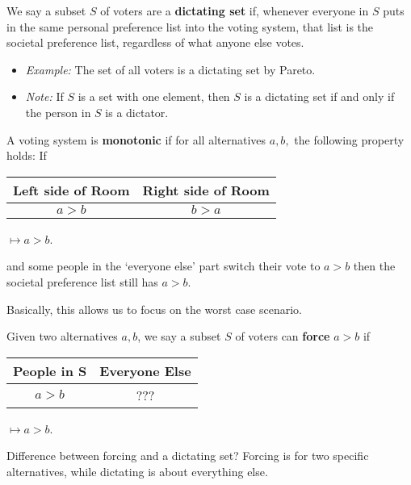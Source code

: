 \begin{definition}
    We say a subset $S$ of voters are a \textbf{dictating set} if, whenever everyone in $S$ puts in the same personal preference list into the voting system, that list is the societal preference list, regardless of what anyone else votes.
    \begin{itemize}
        \item \emph{Example:} The set of all voters is a dictating set by Pareto.
        \item \emph{Note:} If $S$ is a set with one element, then $S$ is a dictating set if and only if the person in $S$ is a dictator.
    \end{itemize}
\end{definition}
\begin{definition}[Monotonic]
    A voting system is \textbf{monotonic} if for all alternatives $a,b,$ the following property holds: If

    \begin{tabular}{c|c}
        Left side of Room & Right side of Room \\
        \hline
        $a>b$ & $b>a$
    \end{tabular} $\mapsto a>b$.

    and some people in the `everyone else' part switch their vote to $a>b$ then the societal preference list still has $a>b$.
\end{definition}
Basically, this allows us to focus on the worst case scenario.
\begin{definition}[Forcing]
    Given two alternatives $a,b$, we say a subset $S$ of voters can \textbf{force} $a>b$ if 

    \begin{tabular}{c|c}
        People in S & Everyone Else\\
        \hline
        $a>b$ & ???
    \end{tabular} $\mapsto a>b$.
\end{definition}
Difference between forcing and a dictating set? Forcing is for two specific alternatives, while dictating is about everything else.

